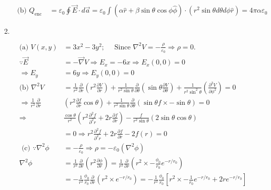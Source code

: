 \begin{enumerate}
\begin{answer}
\begin{align*}
	\text { (b) } Q_{\text {enc }}&=\varepsilon_{0} \oint \vec{E} \cdot d \vec{a}=\varepsilon_{0} \int(\alpha \hat{r}+\beta \sin \theta \cos \phi \hat{\phi}) \cdot\left(r^{2} \sin \theta d \theta d \phi \hat{r}\right)=4 \pi \alpha \varepsilon_{0}
	\end{align*}
\end{answer}
\item $\left. \right. $
\begin{answer}
	\begin{align*}
 \text{(a) }V(x, y)&=3 x^{2}-3 y^{2} ; \quad\text{ Since }\nabla^{2} V=-\frac{\rho}{\varepsilon_{0}} \Rightarrow \rho=0.\\
	\because \vec{E}&=-\vec{\nabla} V \Rightarrow E_{x}=-6 x \Rightarrow E_{x}(0,0)=0 \\
	\Rightarrow E_{y}&=6 y \Rightarrow E_{y}(0,0)=0\\
	\text{(b) }\nabla^{2} V&=\frac{1}{r^{2}} \frac{\partial}{\partial r}\left(r^{2} \frac{\partial V}{\partial r}\right)+\frac{1}{r^{2} \sin \theta} \frac{\partial}{\partial \theta}\left(\sin \theta \frac{\partial V}{\partial \theta}\right)+\frac{1}{r^{2} \sin ^{2} \theta}\left(\frac{\partial^{2} V}{\partial \phi^{2}}\right)=0\\
	\Rightarrow \frac{1}{r^{2}} \frac{\partial}{\partial r}&\left(r^{2} \frac{\partial f}{\partial r} \cos \theta\right)+\frac{1}{r^{2} \sin \theta} \frac{\partial}{\partial \theta}(\sin \theta f \times-\sin \theta)=0 \\
	\Rightarrow &\frac{\cos \theta}{r^{2}}\left(r^{2} \frac{\partial^{2} f}{\partial^{2} r}+2 r \frac{\partial f}{\partial r}\right)-\frac{f}{r^{2} \sin \theta}(2 \sin \theta \cos \theta)\\&=0 \Rightarrow r^{2} \frac{\partial^{2} f}{\partial^{2} r}+2 r \frac{\partial f}{\partial r}-2 f(r)=0\\
\text{	(c) }\because \nabla^{2} \phi&=-\frac{\rho}{\varepsilon_{0}} \Rightarrow \rho=-\varepsilon_{0}\left(\nabla^{2} \phi\right)\\
	\nabla^{2} \phi&=\frac{1}{r^{2}} \frac{\partial}{\partial r}\left(r^{2} \frac{\partial \phi}{\partial r}\right)=\frac{1}{r^{2}} \frac{\partial}{\partial r}\left(r^{2} \times-\frac{\phi_{0}}{r_{0}} e^{-r / r_{0}}\right)\\&=-\frac{1}{r^{2}} \frac{\phi_{0}}{r_{0}} \frac{\partial}{\partial r}\left(r^{2} \times e^{-r / r_{0}}\right)=-\frac{1}{r^{2}} \frac{\phi_{0}}{r_{0}}\left[r^{2} \times-\frac{1}{r_{0}} e^{-r / r_{0}}+2 r e^{-r / r_{0}}\right] \\

\end{align*}
\end{answer}
\end{enumerate}
